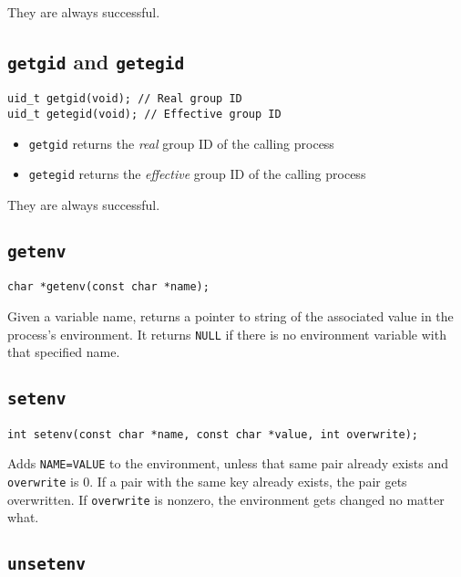 \documentclass{article}
\begin{document}
They are always successful.


\subsection{\texttt{getgid} and \texttt{getegid}}

\begin{verbatim}
uid_t getgid(void); // Real group ID
uid_t getegid(void); // Effective group ID
\end{verbatim}

\begin{itemize}
    \item \texttt{getgid} returns the \textit{real} group ID of the calling process
    \item \texttt{getegid} returns the \textit{effective} group ID of the calling process
\end{itemize}

They are always successful.


\subsection{\texttt{getenv}}

\begin{verbatim}
char *getenv(const char *name);
\end{verbatim}

Given a variable name, returns a pointer to string of the associated value in the process's environment. It returns \texttt{NULL} if there is no environment variable with that specified name.


\subsection{\texttt{setenv}}

\begin{verbatim}
int setenv(const char *name, const char *value, int overwrite);
\end{verbatim}

Adds \texttt{NAME=VALUE} to the environment, unless that same pair already exists and \texttt{overwrite} is 0. If a pair with the same key already exists, the pair gets overwritten. If \texttt{overwrite} is nonzero, the environment gets changed no matter what.

\subsection{\texttt{unsetenv}}
\end{document}

